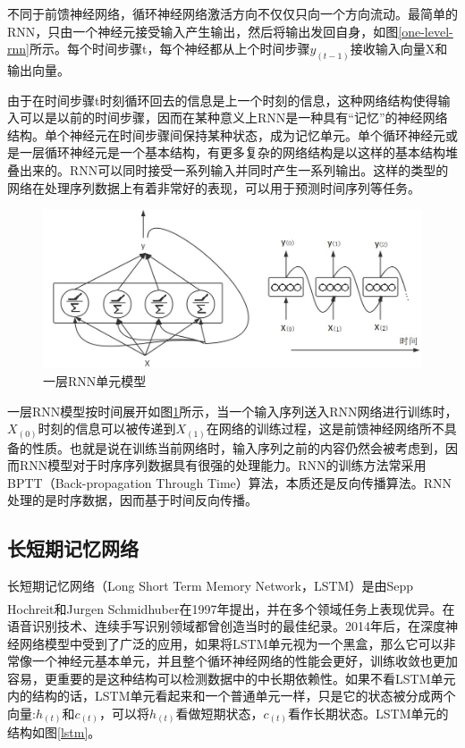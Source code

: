 \documentclass[winfonts,master,oneside,nobackinfo]{njuthesis}
\newcommand{\upcite}[1]{\textsuperscript{\textsuperscript{\cite{#1}}}}
\begin{document}
不同于前馈神经网络，循环神经网络激活方向不仅仅只向一个方向流动。最简单的RNN，只由一个神经元接受输入产生输出，然后将输出发回自身，如图\ref{one-level-rnn}所示。每个时间步骤t，每个神经都从上个时间步骤$y _ { ( t - 1 ) }$接收输入向量X和输出向量。

由于在时间步骤t时刻循环回去的信息是上一个时刻的信息，这种网络结构使得输入可以是以前的时间步骤，因而在某种意义上RNN是一种具有“记忆”的神经网络结构。单个神经元在时间步骤间保持某种状态，成为记忆单元。单个循环神经元或是一层循环神经元是一个基本结构，有更多复杂的网络结构是以这样的基本结构堆叠出来的。RNN可以同时接受一系列输入并同时产生一系列输出。这样的类型的网络在处理序列数据上有着非常好的表现，可以用于预测时间序列等任务。

\begin{figure}[h]
\centering
\includegraphics[width=1\textwidth]{./figure/一层RNN.jpg}
\caption{一层RNN单元模型}
\label{a-layer-rnn}
\end{figure}

一层RNN模型按时间展开如图\ref{a-layer-rnn}所示，当一个输入序列送入RNN网络进行训练时，$X_{(0)}$时刻的信息可以被传递到$X_{(1)}$在网络的训练过程，这是前馈神经网络所不具备的性质。也就是说在训练当前网络时，输入序列之前的内容仍然会被考虑到，因而RNN模型对于时序序列数据具有很强的处理能力。RNN的训练方法常采用BPTT（Back-propagation Through Time）算法，本质还是反向传播算法。RNN处理的是时序数据，因而基于时间反向传播。

\subsection{长短期记忆网络}

长短期记忆网络（Long Short Term Memory Network，LSTM）是由Sepp Hochreit和Jurgen Schmidhuber\upcite{Hochreit}在1997年提出，并在多个领域任务上表现优异。在语音识别技术、连续手写识别领域都曾创造当时的最佳纪录。2014年后，在深度神经网络模型中受到了广泛的应用，如果将LSTM单元视为一个黑盒，那么它可以非常像一个神经元基本单元，并且整个循环神经网络的性能会更好，训练收敛也更加容易，更重要的是这种结构可以检测数据中的中长期依赖性。如果不看LSTM单元内的结构的话，LSTM单元看起来和一个普通单元一样，只是它的状态被分成两个向量:${ h } _ { ( t ) }$和$ { c } _ { ( t ) }$，可以将${ h } _ { ( t ) }$看做短期状态，${ c } _ { ( t ) }$看作长期状态。LSTM单元的结构如图\ref{lstm}。
\end{document}
